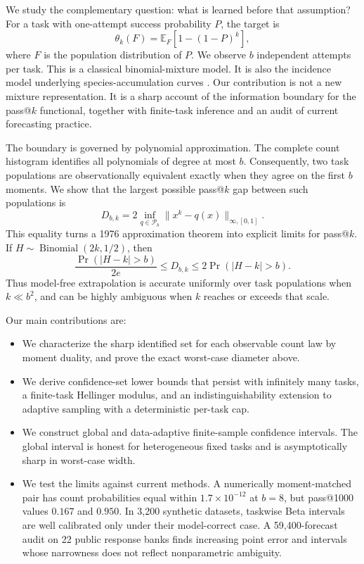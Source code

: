 \documentclass[twoside]{article}
\newcommand{\E}{\mathbb E}
\newcommand{\Pcal}{\mathcal P}
\begin{document}
We study the complementary question: what is learned before that assumption? For a task with one-attempt success probability \(P\), the target is
\begin{equation}
 \theta_k(F)=\E_F[1-(1-P)^k],
\label{eq:target}
\end{equation}
where \(F\) is the population distribution of \(P\). We observe \(b\) independent attempts per task. This is a classical binomial-mixture model. It is also the incidence model underlying species-accumulation curves \citep{colwell2004}. Our contribution is not a new mixture representation. It is a sharp account of the information boundary for the pass@\(k\) functional, together with finite-task inference and an audit of current forecasting practice.

The boundary is governed by polynomial approximation. The complete count histogram identifies all polynomials of degree at most \(b\). Consequently, two task populations are observationally equivalent exactly when they agree on the first \(b\) moments. We show that the largest possible pass@\(k\) gap between such populations is \[ D_{b,k}=2\inf_{q\in\Pcal_b}\|x^k-q(x)\|_{\infty,[0,1]}. \] This equality turns a 1976 approximation theorem \citep{newman1976} into explicit limits for pass@\(k\). If \(H\sim\operatorname{Binomial}(2k,1/2)\), then \[ \frac{\Pr(|H-k|>b)}{2e} \leq D_{b,k}\leq 2\Pr(|H-k|>b). \] Thus model-free extrapolation is accurate uniformly over task populations when \(k\ll b^2\), and can be highly ambiguous when \(k\) reaches or exceeds that scale.

Our main contributions are:
\begin{itemize}
\item We characterize the sharp identified set for each observable count law
by moment duality, and prove the exact worst-case diameter above.
\item We derive confidence-set lower bounds that persist with infinitely many
tasks, a finite-task Hellinger modulus, and an indistinguishability extension to adaptive sampling with a deterministic per-task cap.
\item We construct global and data-adaptive finite-sample confidence
intervals. The global interval is honest for heterogeneous fixed tasks and is asymptotically sharp in worst-case width.
\item We test the limits against current methods. A numerically moment-matched
pair has count probabilities equal within \(1.7\times10^{-12}\) at \(b=8\), but pass@1000 values \(0.167\) and \(0.950\). In 3,200 synthetic datasets, taskwise Beta intervals are well calibrated only under their model-correct case. A 59,400-forecast audit on 22 public response banks finds increasing point error and intervals whose narrowness does not reflect nonparametric ambiguity.
\end{itemize}
\end{document}
